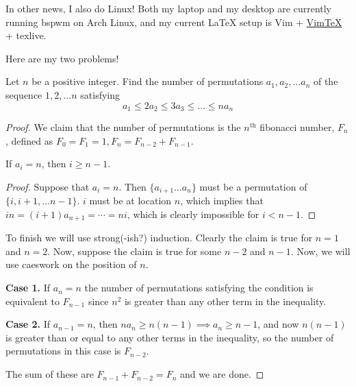 \documentclass[a4paper]{scrartcl}
\begin{document}
In other news, I also do Linux! Both my laptop and my desktop are currently running bspwm on Arch Linux, and my current \LaTeX{} setup is Vim + \href{https://github.com/lervag/vimtex}{VimTeX} + texlive. 

\newpage
Here are my two problems!

\begin{example*}
	Let $n$ be a positive integer. Find the number of permutations $a_1, a_2, \dots a_n$ of the sequence $1,2,\dots n$ satisfying 
	\[a_1 \leqslant 2a_2 \leqslant 3a_3 \leqslant \dots \leqslant na_n\]
\end{example*}
\begin{proof}
	We claim that the number of permutations is the $n^\text{th}$ fibonacci number, $F_n$, defined as $F_0 = F_1 = 1, F_n = F_{n-2} + F_{n-1}$.
	\begin{claim*}
		If $a_i = n$, then $i \geq n-1$.
	\end{claim*}
	\begin{proof}
	Suppose that $a_i = n$. Then $\{a_{i+1} \dots a_n\}$ must be a permutation of $\{ i, i+1, \dots n-1\}$. $i$ must be at location $n$, which implies that $in = (i+1)a_{n+1} = \cdots = ni$, which is clearly impossible for $i < n-1$.
	\end{proof}

	To finish we will use strong(-ish?) induction. Clearly the claim is true for $n=1$ and $n=2$. Now, suppose the claim is true for some $n-2$ and $n-1$. Now, we will use caeswork on the position of $n$.

	\textbf{Case 1.} If $a_n = n$ the number of permutations satisfying the condition is equivalent to $F_{n-1}$ since $n^2$ is greater than any other term in the inequality.

	\textbf{Case 2.} If $a_{n-1} = n$, then $na_n \geq n(n-1) \implies a_{n} \geq n-1$, and now $n(n-1)$ is greater than or equal to any other terms in the inequality, so the number of permutations in this case is $F_{n-2}$.

	The sum of these are $F_{n-1} + F_{n-2} = F_n$ and we are done.

\end{proof}
\end{document}
